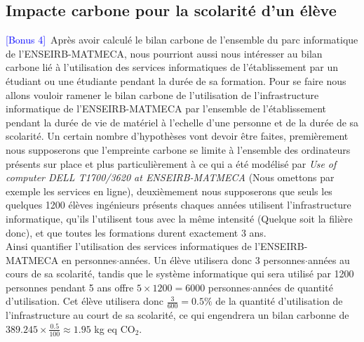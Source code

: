 \documentclass[12pt,a4paper]{paper}
\begin{document}
\subsection{Impacte carbone pour la scolarité d'un élève}
\textcolor{blue}{[Bonus 4]}~Après avoir calculé le bilan carbone de l'ensemble du parc informatique de l'ENSEIRB-MATMECA, nous pourriont aussi nous intéresser au bilan carbone lié à l'utilisation des services informatiques de l'établissement par un étudiant ou une étudiante pendant la durée de sa formation. Pour se faire nous allons vouloir ramener le bilan carbone de l'utilisation de l'infrastructure informatique de l'ENSEIRB-MATMECA par l'ensemble de l'établissement pendant la durée de vie de matériel à l'echelle d'une personne et de la durée de sa scolarité. Un certain nombre d'hypothèses vont devoir être faites, premièrement nous supposerons que l'empreinte carbone se limite à l'ensemble des ordinateurs présents sur place et plus particulièrement à ce qui a été modélisé par \textit{Use of computer DELL T1700/3620 at ENSEIRB-MATMECA} (Nous omettons par exemple les services en ligne), deuxièmement nous supposerons que seuls les quelques 1200 élèves ingénieurs présents chaques années utilisent l'infrastructure informatique, qu'ils l'utilisent tous avec la même intensité (Quelque soit la filière donc), et que toutes les formations durent exactement 3 ans. \\
Ainsi quantifier l'utilisation des services informatiques de l'ENSEIRB-MATMECA en personnes$\cdot$années. Un élève utilisera donc 3 personnes$\cdot$années au cours de sa scolarité, tandis que le système informatique qui sera utilisé par 1200 personnes pendant 5 ans offre $5\times1200=6000$ personnes$\cdot$années de quantité d'utilisation. Cet élève utilisera donc $\frac{3}{600}=0.5\%$ de la quantité d'utilisation de l'infrastructure au court de sa scolarité, ce qui engendrera un bilan carbonne de $389.245\times\frac{0.5}{100}\approx1.95$ kg eq CO$_{2}$.
\end{document}
